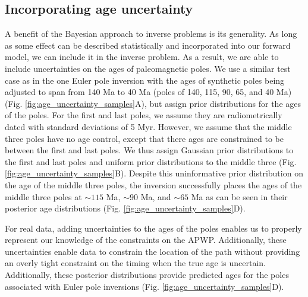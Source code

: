 \documentclass[11pt,letterpaper]{article}
\begin{document}
\subsection*{Incorporating age uncertainty}
\label{sec:age_uncertainty}
A benefit of the Bayesian approach to inverse problems is its generality. As long as some effect can be described statistically and incorporated into our forward model, we can include it in the inverse problem. As a result, we are able to include uncertainties on the ages of paleomagnetic poles. We use a similar test case as in the one Euler pole inversion with the ages of synthetic poles being adjusted to span from 140 Ma to 40 Ma (poles of 140, 115, 90, 65, and 40 Ma) (Fig. \ref{fig:age_uncertainty_samples}A), but assign prior distributions for the ages of the poles. For the first and last poles, we assume they are radiometrically dated with standard deviations of 5 Myr. However, we assume that the middle three poles have no age control, except that there ages are constrained to be between the first and last poles. We thus assign Gaussian prior distributions to the first and last poles and uniform prior distributions to the middle three (Fig. \ref{fig:age_uncertainty_samples}B). Despite this uninformative prior distribution on the age of the middle three poles, the inversion successfully places the ages of the middle three poles at $\sim115$ Ma, $\sim90$ Ma,  and $\sim65$ Ma as can be seen in their posterior age distributions (Fig. \ref{fig:age_uncertainty_samples}D).

For real data, adding uncertainties to the ages of the poles enables us to properly represent our knowledge of the constraints on the APWP. Additionally, these uncertainties enable data to constrain the location of the path without providing an overly tight constraint on the timing when the true age is uncertain. Additionally, these posterior distributions provide predicted ages for the poles associated with Euler pole inversions (Fig. \ref{fig:age_uncertainty_samples}D).
\end{document}
